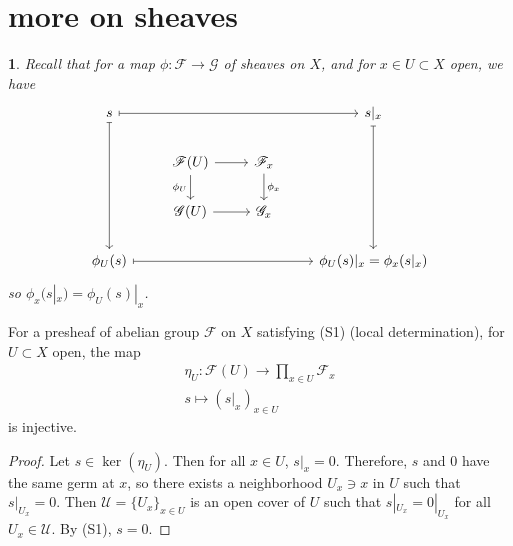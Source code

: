 \documentclass[12pt]{article}
\newtheorem{para}[theorem]{}
\begin{document}

\section{more on sheaves} %

\begin{para}
	Recall that for a map $\phi:\mathscr{F}\to\mathscr{G}$ of sheaves on $X$, and for $x\in U\subset X$ open, we have 
	\begin{equation*}
\begin{tikzcd}
s \arrow[rrr, maps to] \arrow[ddd, maps to] &                                               &                                   & s|_x \arrow[ddd, maps to] \\
                                            & \mathscr{F}(U) \arrow[r] \arrow[d, "\phi_U"'] & \mathscr{F}_x \arrow[d, "\phi_x"] &                           \\
                                            & \mathscr{G}(U) \arrow[r]                      & \mathscr{G}_x                     &                           \\
\phi_U(s) \arrow[rrr, maps to]              &                                               &                                   & \phi_U(s)|_x=\phi_x(s|_x)
\end{tikzcd}
	\end{equation*}
	so $\phi_x(s|_x)=\phi_U(s)|_x$.
\end{para}

\begin{lemma}
	For a presheaf of abelian group $\mathscr{F}$ on $X$ satisfying (S1) (local determination), for $U\subset X$ open, the map 
	\begin{gather*}
		\eta_U:\mathscr{F}(U) \to \prod_{x\in U}\mathscr{F}_x \\
		s \mapsto (s|_x)_{x\in U}
	\end{gather*}
	is injective.
\end{lemma}
\begin{proof}
	Let $s\in\ker(\eta_U)$. Then for all $x\in U$, $s|_x=0$. Therefore, $s$ and 0 have the same germ at $x$, so there exists a neighborhood $U_x\ni x$ in $U$ such that $s|_{U_x}=0$. Then $\mathcal{U}=\{U_x\}_{x\in U}$ is an open cover of $U$ such that $s|_{U_x} = 0|_{U_x}$ for all $U_x\in \mathcal{U}$. By (S1), $s=0$.
\end{proof}
\end{document}
